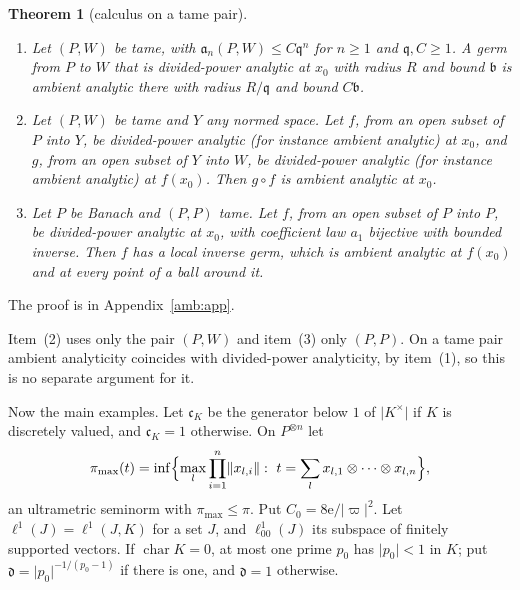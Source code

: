 \documentclass[11pt]{amsart}
\newtheorem{theorem}{Theorem}[section]
\theoremstyle{definition}
\theoremstyle{remark}
\numberwithin{equation}{section}
\newcommand{\abs}[1]{\lvert #1\rvert}
\newcommand{\norm}[1]{\lVert #1\rVert}
\theoremstyle{plain}
\theoremstyle{definition}
\theoremstyle{plain}
\begin{document}
\begin{theorem}[calculus on a tame pair]\label{amb:thm:tame-calculus}
\begin{enumerate}
\item Let $(P,W)$ be tame, with $\mathfrak a_n(P,W)\le C\mathfrak q^n$ for $n\ge1$ and $\mathfrak q,C\ge1$. A germ from $P$ to $W$ that is divided-power analytic at $x_0$ with radius $R$ and bound $\mathfrak b$ is ambient analytic there with radius $R/\mathfrak q$ and bound $C\mathfrak b$.
\item Let $(P,W)$ be tame and $Y$ any normed space. Let $f$, from an open subset of $P$ into $Y$, be divided-power analytic (for instance ambient analytic) at $x_0$, and $g$, from an open subset of $Y$ into $W$, be divided-power analytic (for instance ambient analytic) at $f(x_0)$. Then $g\circ f$ is ambient analytic at $x_0$.
\item Let $P$ be Banach and $(P,P)$ tame. Let $f$, from an open subset of $P$ into $P$, be divided-power analytic at $x_0$, with coefficient law $a_1$ bijective with bounded inverse. Then $f$ has a local inverse germ, which is ambient analytic at $f(x_0)$ and at every point of a ball around it.
\end{enumerate}
\end{theorem}
The proof is in Appendix~\ref{amb:app}.

Item~(2) uses only the pair $(P,W)$ and item~(3) only $(P,P)$. On a tame pair ambient analyticity coincides with divided-power analyticity, by item~(1), so this is no separate argument for it.

Now the main examples. Let $\mathfrak c_K$ be the generator below $1$ of $\abs{K^\times}$ if $K$ is discretely valued, and $\mathfrak c_K=1$ otherwise. On $P^{\otimes n}$ let
\[
 \pi_{\max}(t)=\inf\Bigl\{\max_l\prod_{i=1}^n\norm{x_{l,i}}:\ t=\sum_lx_{l,1}\otimes\dots\otimes x_{l,n}\Bigr\},
\]
an ultrametric seminorm with $\pi_{\max}\le\pi$. Put $C_0=8\mathrm e/\abs\varpi^2$. Let $\ell^1(J)=\ell^1(J,K)$ for a set $J$, and $\ell^1_{00}(J)$ its subspace of finitely supported vectors. If $\operatorname{char}K=0$, at most one prime $p_0$ has $\abs{p_0}<1$ in $K$; put $\mathfrak d=\abs{p_0}^{-1/(p_0-1)}$ if there is one, and $\mathfrak d=1$ otherwise.
\end{document}
